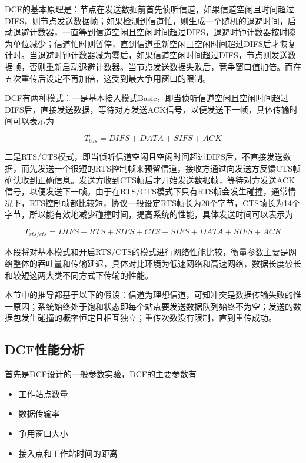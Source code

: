 \documentclass{article}
\begin{document}
DCF的基本原理是：节点在发送数据前首先侦听信道，如果信道空闲且时间超过DIFS，则节点发送数据帧；如果检测到信道忙，则生成一个随机的退避时间，启动退避计数器，一直等到信道空闲且空闲时间超过DIFS，退避时钟计数器按时隙为单位减少；信道忙时则暂停，直到信道重新空闲且空闲时间超过DIFS后才恢复计时。当退避时钟计数器减为零后，如果信道空闲时间超过DIFS，节点则发送数据帧，否则重新启动退避计数器。当节点发送数据失败后，竞争窗口值加倍。而在五次重传后设定不再加倍，这受到最大争用窗口的限制。

DCF有两种模式：一是基本接入模式Basic，即当侦听信道空闲且空闲时间超过DIFS后，直接发送数据，等待对方发送ACK信号，以便发送下一帧，具体传输时间可以表示为

\begin{equation}
T_{bas} = DIFS + DATA + SIFS + ACK
\end{equation}

二是RTS/CTS模式，即当侦听信道空闲且空闲时间超过DIFS后，不直接发送数据，而先发送一个很短的RTS控制帧来预留信道，接收方通过向发送方反馈CTS帧确认收到正确信息。发送方收到CTS帧后才开始发送数据帧，等待对方发送ACK信号，以便发送下一帧。由于在RTS/CTS模式下只有RTS帧会发生碰撞，通常情况下，RTS控制帧都比较短，协议一般设定RTS帧长为20个字节，CTS帧长为14个字节，所以能有效地减少碰撞时间，提高系统的性能，具体发送时间可以表示为

\begin{equation}
T_{rts/cts} = DIFS + RTS + SIFS + CTS + SIFS + DATA + SIFS + ACK
\end{equation}

本段将对基本模式和开启RTS/CTS的模式进行网络性能比较，衡量参数主要是网络整体的吞吐量和传输延迟，具体对比环境为低速网络和高速网络，数据长度较长和较短这两大类不同方式下传输的性能。

本节中的推导都基于以下的假设：信道为理想信道，可知冲突是数据传输失败的惟一原因；系统始终处于饱和状态即每个站点要发送数据队列始终不为空；发送的数据包发生碰撞的概率恒定且相互独立；重传次数没有限制，直到重传成功。
\subsection{DCF性能分析}

首先是DCF设计的一般参数实验，DCF的主要参数有

\begin{itemize}
	\item {工作站点数量}
	\item {数据传输率}
	\item {争用窗口大小}
	\item {接入点和工作站时间的距离}
\end{itemize}
\end{document}
